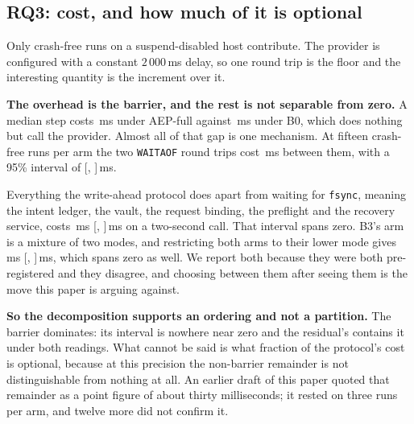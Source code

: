 \subsection{RQ3: cost, and how much of it is optional}
\label{sec:eval-rq3}

Only crash-free runs on a suspend-disabled host contribute. The provider is
configured with a constant $2\,000$\,ms delay, so one round trip is the floor
and the interesting quantity is the increment over it.



\textbf{The overhead is the barrier, and the rest is not separable from
zero.} A median step costs \AepStepMedian{}\,ms under AEP-full against
\BzeroStepMedian{}\,ms under B0, which does nothing but call the provider.
Almost all of that gap is one mechanism. At fifteen crash-free runs per arm the
two \texttt{WAITAOF} round trips cost \BarrierCostFifteen{}\,ms between them,
with a 95\% interval of
[\BarrierCostFifteenLow{}, \BarrierCostFifteenHigh{}]\,ms.

Everything the write-ahead protocol does apart from waiting for \texttt{fsync},
meaning the intent ledger, the vault, the request binding, the preflight and
the recovery service, costs
\ProtocolMinusBarrierFifteen{}\,ms
[\ProtocolMinusBarrierFifteenLow{}, \ProtocolMinusBarrierFifteenHigh{}]\,ms on
a two-second call. That interval spans zero. B3's arm is a mixture of two
modes, and restricting both arms to their lower mode gives
\ProtocolMinusBarrierLowerMode{}\,ms
[\ProtocolMinusBarrierLowerModeLow{}, \ProtocolMinusBarrierLowerModeHigh{}]\,ms,
which spans zero as well. We report both because they were both pre-registered
and they disagree, and choosing between them after seeing them is the move this
paper is arguing against.

\textbf{So the decomposition supports an ordering and not a partition.} The
barrier dominates: its interval is nowhere near zero and the residual's
contains it under both readings. What cannot be said is what fraction of the
protocol's cost is optional, because at this precision the non-barrier
remainder is not distinguishable from nothing at all. An earlier draft of this
paper quoted that remainder as a point figure of about thirty milliseconds; it
rested on three runs per arm, and twelve more did not confirm it.

